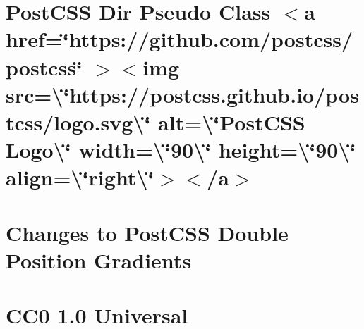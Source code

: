 \documentclass[twoside]{book}
\newcommand{\+}{\discretionary{\mbox{\scriptsize$\hookleftarrow$}}{}{}}
\begin{document}
\chapter{Post\+CSS Dir Pseudo Class \texorpdfstring{$<$}{<}a href=\char`\"{}https\+://github.\+com/postcss/postcss\char`\"{} \texorpdfstring{$>$}{>}\texorpdfstring{$<$}{<}img src=\textbackslash{}\char`\"{}https\+://postcss.\+github.\+io/postcss/logo.\+svg\textbackslash{}\char`\"{} alt=\textbackslash{}\char`\"{}\+Post\+CSS Logo\textbackslash{}\char`\"{} width=\textbackslash{}\char`\"{}90\textbackslash{}\char`\"{} height=\textbackslash{}\char`\"{}90\textbackslash{}\char`\"{} align=\textbackslash{}\char`\"{}right\textbackslash{}\char`\"{}\texorpdfstring{$>$}{>}\texorpdfstring{$<$}{<}/a\texorpdfstring{$>$}{>}}
\label{md__c___users_vaishnavi_jadhav__desktop__developer_code_mean_stack_example_client_node_modules_p8cde346e9a58edf4754dfb77d7866e69}

\chapter{Changes to Post\+CSS Double Position Gradients}
\label{md__c___users_vaishnavi_jadhav__desktop__developer_code_mean_stack_example_client_node_modules_pea30f193ba50092f9485d512825fb49e}

\chapter{CC0 1.0 Universal}
\label{md__c___users_vaishnavi_jadhav__desktop__developer_code_mean_stack_example_client_node_modules_p6f2c4073884656e4a14238b72fe14457}

\end{document}
